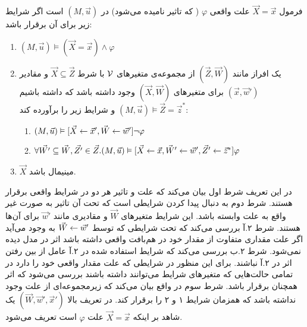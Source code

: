 \begin{definition}
      \label{def:cause}
      فرمول
      $\vec X = \vec x$
      علت واقعی
      $\varphi$
      (
      که تاثیر
      نامیده می‌شود)
      در
      $(M,\vec{u})$
      است
      اگر شرایط زیر برای آن برقرار باشد:
      \begin{enumerate}
            \item $(M,\vec{u}) \vDash (\vec{X} = \vec{x}) \wedge \varphi$
            \item یک افراز مانند
                  $(\vec{Z},\vec{W})$
                  از مجموعه‌ی متغیر‌های
                  $\mathcal{V}$
                  با شرط
                  $\vec{X} \subseteq \vec{Z}$
                  و مقادیر
                  $(\vec{x},\vec{w}')$
                  برای متغیر‌های
                  $(\vec{X},\vec{W})$
                  وجود داشته باشد که داشته باشیم
                  $(M,\vec{u})\vDash \vec{Z} = \vec{z}^*$
                  و شرایط زیر را برآورده کند:
                  \begin{enumerate}
                        \item $(M,\vec u)\vDash[\vec{X}\leftarrow\vec{x}',\vec{W}\leftarrow\vec{w}']
                                    \neg \varphi$
                        \item $\forall \vec{W'} \subseteq \vec{W},\vec{Z'}\in \vec{Z}.
                                    (M,\vec{u})\vDash [\vec X\leftarrow\vec x,\vec{W}'\leftarrow \vec{w}',\vec{Z}'\leftarrow \vec{z}^*]\varphi$
                  \end{enumerate}
            \item $\vec X$
                  مینیمال باشد.
      \end{enumerate}
\end{definition}
در این تعریف شرط اول بیان می‌کند که علت و تاثیر هر دو در شرایط واقعی برقرار هستند.
شرط دوم به دنبال پیدا کردن شرایطی است که تحت آن تاثیر به صورت غیر واقع به علت وابسته باشد.
این شرایط متغیرهای
$\vec W$
و مقادیری مانند
$\vec{w}'$
برای آن‌ها هستند.
شرط ۲.آ بررسی می‌کند که تحت شرایطی که توسط
$\vec W \leftarrow \vec{w}'$
به وجود می‌آید اگر علت مقداری متفاوت از مقدار خود در هم‌بافت واقعی داشته باشد اثر در مدل دیده نمی‌شود.
شرط ۲.ب بررسی می‌کند که شرایط
استفاده شده در ۲.آ عامل
از بین رفتن اثر در ۲.آ نباشند.
برای این منظور در شرایطی که علت مقدار واقعی خود را دارد در تمامی حالت‌هایی که متغیر‌های شرایط می‌توانند داشته باشند بررسی می‌شود که اثر همچنان برقرار باشد.
شرط سوم در واقع بیان می‌کند که زیرمجموعه‌ای از علت وجود نداشته باشد که همزمان شرایط ۱ و ۲ را برقرار کند.
در تعریف بالا
$(\vec W, \vec w',\vec x')$
یک شاهد
بر اینکه
$\vec X = \vec x$
علت
$\varphi$
است تعریف می‌شود.


